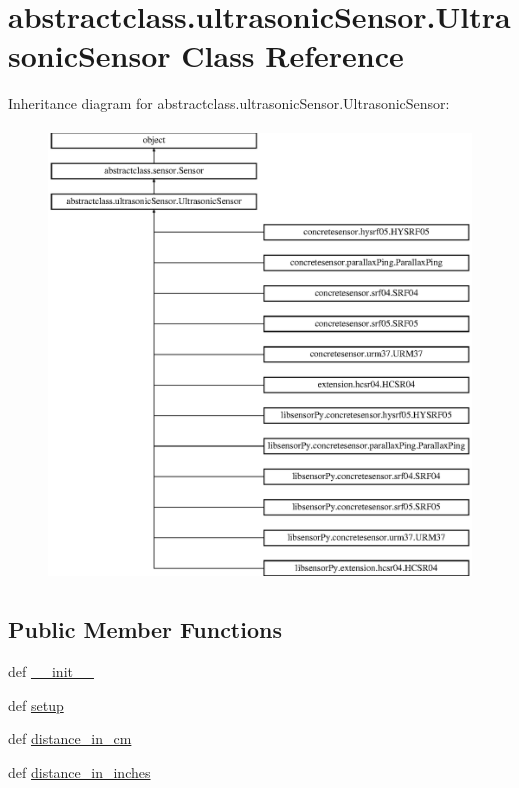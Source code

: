 \hypertarget{classabstractclass_1_1ultrasonicSensor_1_1UltrasonicSensor}{}\section{abstractclass.\+ultrasonic\+Sensor.\+Ultrasonic\+Sensor Class Reference}
\label{classabstractclass_1_1ultrasonicSensor_1_1UltrasonicSensor}
Inheritance diagram for abstractclass.\+ultrasonic\+Sensor.\+Ultrasonic\+Sensor\+:\begin{figure}[H]
\begin{center}
\leavevmode
\includegraphics[height=12.000000cm]{classabstractclass_1_1ultrasonicSensor_1_1UltrasonicSensor}
\end{center}
\end{figure}
\subsection*{Public Member Functions}
\begin{DoxyCompactItemize}
\item 
def \hyperlink{classabstractclass_1_1ultrasonicSensor_1_1UltrasonicSensor_a11267981cce7608eb7360b396320ea76}{\+\_\+\+\_\+init\+\_\+\+\_\+}
\item 
def \hyperlink{classabstractclass_1_1ultrasonicSensor_1_1UltrasonicSensor_a8ab01c52cfc725a33efcf617fd3ddd1d}{setup}
\item 
def \hyperlink{classabstractclass_1_1ultrasonicSensor_1_1UltrasonicSensor_a3cfd8cd363ae3e99b917292f5a04f64e}{distance\+\_\+in\+\_\+cm}
\item 
def \hyperlink{classabstractclass_1_1ultrasonicSensor_1_1UltrasonicSensor_a9986880dc6dee62d451c7cb5ea3d1d03}{distance\+\_\+in\+\_\+inches}
\end{DoxyCompactItemize}
